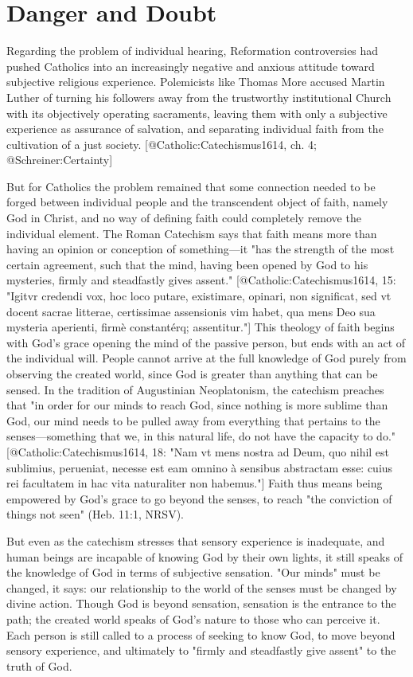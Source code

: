\section{Danger and Doubt}


Regarding the problem of individual hearing, Reformation controversies had
pushed Catholics into an increasingly negative and anxious attitude toward
subjective religious experience. 
Polemicists like Thomas More accused Martin Luther of turning his followers away
from the trustworthy institutional Church with its objectively operating
sacraments, leaving them with only a subjective experience as assurance of
salvation, and separating individual faith from the cultivation of a just
society. 
[@Catholic:Catechismus1614, ch. 4; @Schreiner:Certainty]

But for Catholics the problem remained that some connection needed to be forged
between individual people and the transcendent object of faith, namely God in
Christ, and no way of defining faith could completely remove the individual
element. 
The Roman Catechism says that faith means more than having an opinion or
conception of something---it "has the strength of the most certain agreement,
such that the mind, having been opened by God to his mysteries, firmly and
steadfastly gives assent." 
[@Catholic:Catechismus1614, 15: 
"Igitvr credendi vox, hoc loco putare, existimare, opinari, non significat, sed
vt docent sacrae litterae, certissimae assensionis vim habet, qua mens Deo sua
mysteria aperienti, firmè constantérq; assentitur."]
This theology of faith begins with God's grace opening the mind of the passive
person, but ends with an act of the individual will. 
People cannot arrive at the full knowledge of God purely from observing the
created world, since God is greater than anything that can be sensed.
In the tradition of Augustinian Neoplatonism, the catechism preaches that "in
order for our minds to reach God, since nothing is more sublime than God, our
mind needs to be pulled away from everything that pertains to the
senses---something that we, in this natural life, do not have the capacity to
do." 
[@Catholic:Catechismus1614, 18: 
"Nam vt mens nostra ad Deum, quo nihil est sublimius, perueniat, necesse est eam
omnino à sensibus abstractam esse: cuius rei facultatem in hac vita naturaliter
non habemus."]
Faith thus means being empowered by God's grace to go beyond the senses, to
reach "the conviction of things not seen" (Heb. 11:1, NRSV).

But even as the catechism stresses that sensory experience is inadequate, and
human beings are incapable of knowing God by their own lights, it still speaks
of the knowledge of God in terms of subjective sensation.
"Our minds" must be changed, it says: our relationship to the world of the
senses must be changed by divine action. 
Though God is beyond sensation, sensation is the entrance to the path; the
created world speaks of God's nature to those who can perceive it. 
Each person is still called to a process of seeking to know God, to move
beyond sensory experience, and ultimately to "firmly and steadfastly give
assent" to the truth of God.

